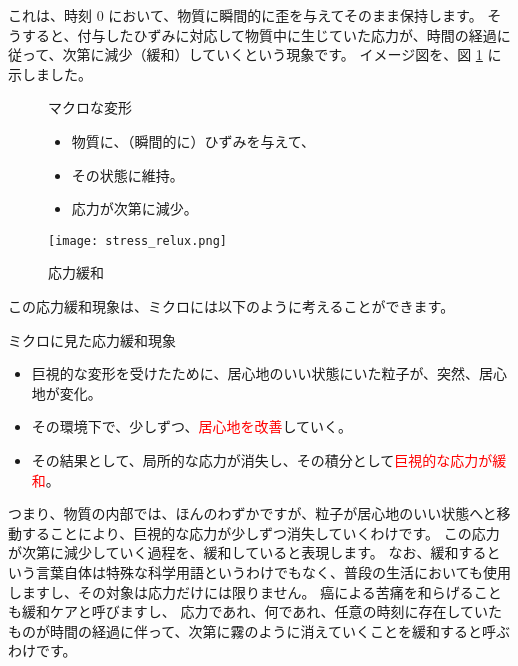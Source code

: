 \documentclass[uplatex,dvipdfmx,a4paper,11pt]{jsreport}
\begin{document}
これは、時刻 0 において、物質に瞬間的に歪を与えてそのまま保持します。
そうすると、付与したひずみに対応して物質中に生じていた応力が、時間の経過に従って、次第に減少（緩和）していくという現象です。
イメージ図を、図 \ref{fig:stress_relux} に示しました。
\begin{figure}[htb]
	\begin{center}
		\begin{minipage}{0.45\textwidth}
			\begin{itembox}[l]{マクロな変形}
				\begin{itemize}
					\item 物質に、（瞬間的に）ひずみを与えて、
					\item その状態に維持。
					\item 応力が次第に減少。
				\end{itemize}
			\end{itembox}
		\end{minipage}
		\begin{minipage}{0.45\textwidth}
			\begin{center}
			\texttt{[image: stress\_relux.png]}
			\end{center}
		\end{minipage}
		\caption{応力緩和}
		\label{fig:stress_relux}
	\end{center}
\end{figure}

この応力緩和現象は、ミクロには以下のように考えることができます。
\begin{center}
	\begin{minipage}{0.9\textwidth}
		\begin{itembox}[l]{ミクロに見た応力緩和現象}
			\begin{itemize}
				\item 巨視的な変形を受けたために、居心地のいい状態にいた粒子が、突然、居心地が変化。
				\item その環境下で、少しずつ、\textcolor{red}{居心地を改善}していく。
				\item その結果として、局所的な応力が消失し、その積分として\textcolor{red}{巨視的な応力が緩和}。
			\end{itemize}
		\end{itembox}
	\end{minipage}
\end{center}
つまり、物質の内部では、ほんのわずかですが、粒子が居心地のいい状態へと移動することにより、巨視的な応力が少しずつ消失していくわけです。
この応力が次第に減少していく過程を、緩和していると表現します。
なお、緩和するという言葉自体は特殊な科学用語というわけでもなく、普段の生活においても使用しますし、その対象は応力だけには限りません。
癌による苦痛を和らげることも緩和ケアと呼びますし、
応力であれ、何であれ、任意の時刻に存在していたものが時間の経過に伴って、次第に霧のように消えていくことを緩和すると呼ぶわけです。
\end{document}
